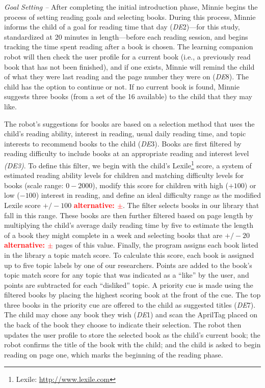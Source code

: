 \documentclass{sigchi}
\begin{document}
\textit{Goal Setting --} After completing the initial introduction phase, Minnie begins the process of setting reading goals and selecting books. During this process, Minnie informs the child of a goal for reading time that day (\textit{DE}2)---for this study, standardized at 20 minutes in length---before each reading session, and begins tracking the time spent reading after a book is chosen. The learning companion robot will then check the user profile for a current book (i.e., a previously read book that has not been finished), and if one exists, Minnie will remind the child of what they were last reading and the page number they were on (\textit{DE}8). The child has the option to continue or not. If no current book is found, Minnie suggests three books (from a set of the 16 available) to the child that they may like.

The robot's suggestions for books are based on a selection method that uses the child's reading ability, interest in reading, usual daily reading time, and topic interests to recommend books to the child (\textit{DE}3). Books are first filtered by reading difficulty to include books at an appropriate reading and interest level \textit{(DE3)}. To define this filter, we begin with the child's Lexile\footnote{Lexile: \href{http://www.lexile.com}{http://www.lexile.com}} score, a system of estimated reading ability levels for children and matching difficulty levels for books (scale range: $0-2000$), modify this score for children with high ($+100$) or low ($-100$) interest in reading, and define an ideal difficulty range as the modified Lexile score $+/-100$ \textcolor{red}{\textbf{alternative: $\pm$}}. The filter selects books in our library that fall in this range. These books are then further filtered based on page length by multiplying the child's average daily reading time by five to estimate the length of a book they might complete in a week and selecting books that are $+/-20$ \textcolor{red}{\textbf{alternative: $\pm$}} pages of this value. Finally, the program assigns each book listed in the library a topic match score. To calculate this score, each book is assigned up to five topic labels by one of our researchers. Points are added to the book's topic match score for any topic that was indicated as a ``like'' by the user, and points are subtracted for each ``disliked'' topic. A priority cue is made using the filtered books by placing the highest scoring book at the front of the cue. The top three books in the priority cue are offered to the child as suggested titles (\textit{DE}7). The child may chose any book they wish (\textit{DE}1) and scan the AprilTag placed on the back of the book they choose to indicate their selection. The robot then updates the user profile to store the selected book as the child's current book; the robot confirms the title of the book with the child; and the child is asked to begin reading on page one, which marks the beginning of the reading phase.
\end{document}
